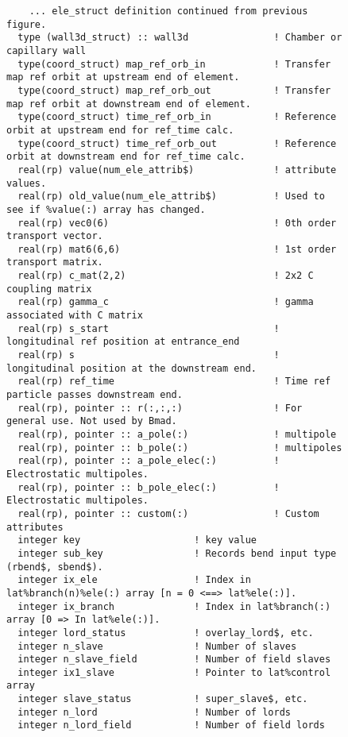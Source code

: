 
\begin{figure}[tb]
\centering
\footnotesize
\begin{verbatim}
    ... ele_struct definition continued from previous figure.
  type (wall3d_struct) :: wall3d               ! Chamber or capillary wall
  type(coord_struct) map_ref_orb_in            ! Transfer map ref orbit at upstream end of element.
  type(coord_struct) map_ref_orb_out           ! Transfer map ref orbit at downstream end of element.
  type(coord_struct) time_ref_orb_in           ! Reference orbit at upstream end for ref_time calc.
  type(coord_struct) time_ref_orb_out          ! Reference orbit at downstream end for ref_time calc.
  real(rp) value(num_ele_attrib$)              ! attribute values.
  real(rp) old_value(num_ele_attrib$)          ! Used to see if %value(:) array has changed.
  real(rp) vec0(6)                             ! 0th order transport vector.
  real(rp) mat6(6,6)                           ! 1st order transport matrix.
  real(rp) c_mat(2,2)                          ! 2x2 C coupling matrix
  real(rp) gamma_c                             ! gamma associated with C matrix
  real(rp) s_start                             ! longitudinal ref position at entrance_end
  real(rp) s                                   ! longitudinal position at the downstream end.
  real(rp) ref_time                            ! Time ref particle passes downstream end.
  real(rp), pointer :: r(:,:,:)                ! For general use. Not used by Bmad.
  real(rp), pointer :: a_pole(:)               ! multipole
  real(rp), pointer :: b_pole(:)               ! multipoles
  real(rp), pointer :: a_pole_elec(:)          ! Electrostatic multipoles.
  real(rp), pointer :: b_pole_elec(:)          ! Electrostatic multipoles.
  real(rp), pointer :: custom(:)               ! Custom attributes
  integer key                    ! key value
  integer sub_key                ! Records bend input type (rbend$, sbend$).
  integer ix_ele                 ! Index in lat%branch(n)%ele(:) array [n = 0 <==> lat%ele(:)].
  integer ix_branch              ! Index in lat%branch(:) array [0 => In lat%ele(:)].
  integer lord_status            ! overlay_lord$, etc.
  integer n_slave                ! Number of slaves
  integer n_slave_field          ! Number of field slaves
  integer ix1_slave              ! Pointer to lat%control array
  integer slave_status           ! super_slave$, etc.
  integer n_lord                 ! Number of lords
  integer n_lord_field           ! Number of field lords

\end{verbatim}
\end{figure}
